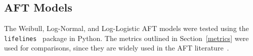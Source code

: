 \subsection{AFT Models}
The Weibull, Log-Normal, and Log-Logistic AFT models were tested using the \texttt{lifelines}~\cite{lifelines} package in Python. The metrics outlined in Section~\ref{metrics} were used for comparisons, since they are widely used in the AFT literature~\cite{aft_models}.
